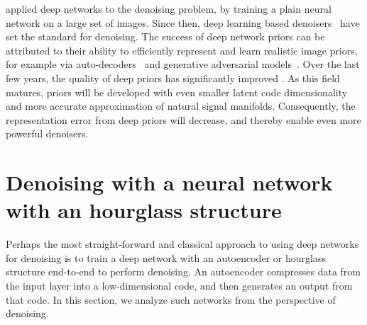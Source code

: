 \citet{burger_image_2012} applied deep networks to the denoising problem, by training a plain neural network on a large set of images.
Since then, deep learning based denoisers~\citep{zhang_beyond_2017} have set the standard for denoising. The success of deep network priors can be attributed to their ability to efficiently represent and learn realistic image priors, for example via auto-decoders~\citep{hinton_reducing_2006} and generative adversarial models~\citep{goodfellow_generative_2014}.
Over the last few years, the quality of deep priors has significantly improved \citep{Karras17, DIP,heckel_deep_2019}. As this field matures, priors will be developed with even smaller latent code dimensionality and more accurate approximation of natural signal manifolds. Consequently, the representation error from deep priors will decrease, and thereby enable even more powerful denoisers.


\section{Denoising with a neural network with an hourglass structure}

Perhaps the most straight-forward and classical approach to using deep networks for denoising is to train a deep network with an autoencoder or hourglass structure end-to-end to perform denoising.   
An autoencoder compresses data from the input layer into a low-dimensional code, and then generates an output from that code. In this section, we analyze such networks from the perspective of denoising.

